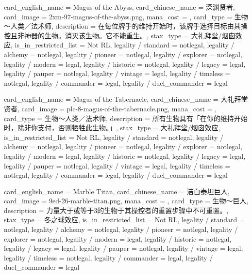 \documentclass[lang = cn, color = black, 10pt]{AllThatStax}
\begin{document}
\card
{
	card_english_name = {Magus of the Abyss},
	card_chinese_name = {深渊贤者},
	card_image = 2xm-97-magus-of-the-abyss.png,
	mana_cost = ,
	card_type = 生物 ～人类／法术师,
	description = {在每位牌手的维持开始时，该牌手选择目标由其操控且非神器的生物。消灭该生物。它不能重生。},
	stax_type = 大礼拜堂/烟囱效应,
	is_in_restricted_list = Not RL,
	legality / standard = notlegal,
	legality / alchemy = notlegal,
	legality / pioneer = notlegal,
	legality / explorer = notlegal,
	legality / modern = legal,
	legality / historic = notlegal,
	legality / legacy = legal,
	legality / pauper = notlegal,
	legality / vintage = legal,
	legality / timeless = notlegal,
	legality / commander = legal,
	legality / duel_commander = legal
}

\card
{
	card_english_name = {Magus of the Tabernacle},
	card_chinese_name = {大礼拜堂贤者},
	card_image = plc-8-magus-of-the-tabernacle.png,
	mana_cost = ,
	card_type = 生物～人类／法术师,
	description = {所有生物具有「在你的维持开始时，除非你支付，否则牺牲此生物。」},
	stax_type = 大礼拜堂/烟囱效应,
	is_in_restricted_list = Not RL,
	legality / standard = notlegal,
	legality / alchemy = notlegal,
	legality / pioneer = notlegal,
	legality / explorer = notlegal,
	legality / modern = legal,
	legality / historic = notlegal,
	legality / legacy = legal,
	legality / pauper = notlegal,
	legality / vintage = legal,
	legality / timeless = notlegal,
	legality / commander = legal,
	legality / duel_commander = legal
}

\card
{
	card_english_name = {Marble Titan},
	card_chinese_name = {洁白泰坦巨人},
	card_image = 9ed-26-marble-titan.png,
	mana_cost = ,
	card_type = 生物～巨人,
	description = {力量大于或等于3的生物于其操控者的重置步骤中不可重置。},
	stax_type = 冬之球效应,
	is_in_restricted_list = Not RL,
	legality / standard = notlegal,
	legality / alchemy = notlegal,
	legality / pioneer = notlegal,
	legality / explorer = notlegal,
	legality / modern = legal,
	legality / historic = notlegal,
	legality / legacy = legal,
	legality / pauper = notlegal,
	legality / vintage = legal,
	legality / timeless = notlegal,
	legality / commander = legal,
	legality / duel_commander = legal
}
\end{document}

